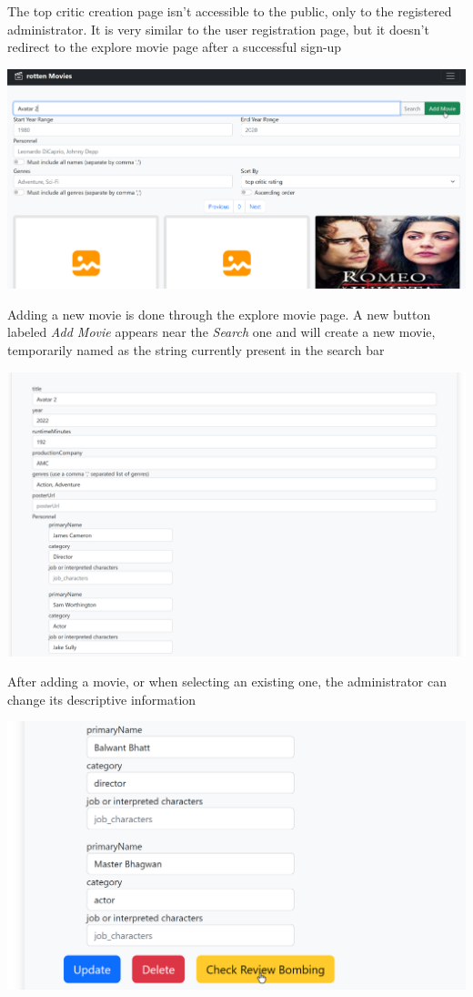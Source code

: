 The top critic creation page isn't accessible to the public, only to the registered administrator. It is very similar to the user registration page, but it doesn't redirect to the explore movie page after a successful sign-up

\includegraphics[scale=0.45]{../../../images/user_manual/add_new_movie.png} 

Adding a new movie is done through the explore movie page. A new button labeled \textit{Add Movie} appears near the \textit{Search} one and will create a new movie, temporarily named as the string currently present in the search bar

\includegraphics[scale=0.45]{../../../images/user_manual/movie_update.png} 

After adding a movie, or when selecting an existing one, the administrator can change its descriptive information

\includegraphics[scale=0.45]{../../../images/user_manual/check_review_bombing.png} 

